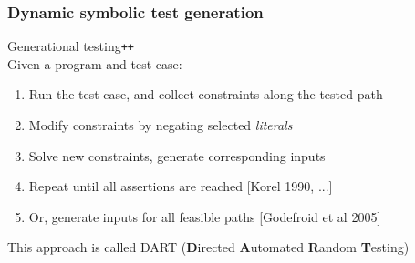 \documentclass[10pt,xcolor={dvipsnames}]{beamer}
\begin{document}

\begin{frame}[fragile]

\frametitle{Dynamic symbolic test generation}

Generational testing\texttt{++}
\\[1em]

\pause
Given a program and test case:
\begin{enumerate}
\item Run the test case, and collect constraints along the tested path \\[0.5em]
\item Modify constraints by negating selected \emph{literals} \\[0.5em]
\item Solve new constraints, generate corresponding inputs \\[0.5em]
\item Repeat until all assertions are reached [Korel 1990, ...] \\[0.5em]
\item Or, generate inputs for all feasible paths [Godefroid et al 2005] \\[1.5em]
\end{enumerate}

\pause
This approach is called DART (\textbf{D}irected \textbf{A}utomated \textbf{R}andom \textbf{T}esting)

\end{frame}

\end{document}
